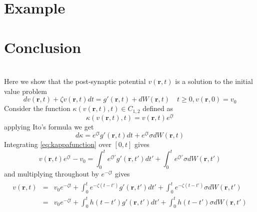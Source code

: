 \documentclass[a4paper,10pt]{article}
\begin{document}
\section{Example}
\section{Conclusion}



\appendices
\section{}\label{app:InitialValueProblemProof}
Here we show that the post-synaptic potential $v(\mathbf r, t)$ is a solution to the initial value problem 
\begin{equation}
 dv(\mathbf r, t) + \zeta v(\mathbf r, t)dt = g'(\mathbf r, t) + dW(\mathbf r, t) \quad t\ge0, v(\mathbf r, 0) = v_0
\end{equation}
Consider the function $\kappa(v(\mathbf r, t), t) \in C_{1,2}$ defined as
\begin{equation}
\kappa(v(\mathbf r, t), t) = v(\mathbf r, t)e^{\zeta t}
\end{equation}
 applying Ito's formula we get
\begin{equation}\label{eq:kappafunction}
 d\kappa = e^{\zeta t}g'(\mathbf r, t)dt + e^{\zeta t}\sigma dW(\mathbf r, t)
\end{equation}
Integrating \eqref{eq:kappafunction} over $[0, t]$ gives 
\begin{equation}\label{eq:kappafunctionInteration}
 v(\mathbf r, t)e^{\zeta t}-v_0 = \int_0^te^{\zeta t'}g'(\mathbf r, t')dt' +\int_0^te^{\zeta t'}\sigma dW(\mathbf r, t')
\end{equation}
and multiplying throughout by $e^{-\zeta t}$ gives 
\begin{eqnarray}
\begin{split}
 v(\mathbf r, t) &=&v_0e^{-\zeta t}+ \int_0^te^{-\zeta(t-t')}g'(\mathbf r, t')dt' +\int_0^te^{-\zeta (t-t')}\sigma dW(\mathbf r, t')\\
&=&v_0e^{-\zeta t}+ \int_0^t h(t-t')g'(\mathbf r, t')dt' +\int_0^th(t-t')\sigma dW(\mathbf r, t')
\end{split}
\end{eqnarray}


\end{document}
